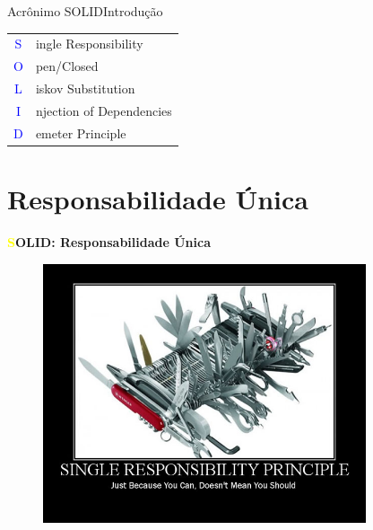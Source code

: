 \documentclass[10pt]{beamer}
\begin{document}

\begin{frame}{Acrônimo SOLID}{Introdução}

\begin{table}[H]
  \centering
  \setlength{\tabcolsep}{1pt}
  \begin{tabular}{cl}
    \Huge \textcolor{blue}{S} & \large ingle Responsibility \\
    \Huge \textcolor{blue}{O} & \large pen/Closed \\
    \Huge \textcolor{blue}{L} & \large iskov Substitution \\
    \Huge \textcolor{blue}{I} & \large njection of Dependencies \\
    \Huge \textcolor{blue}{D} & \large emeter Principle \\
  \end{tabular}
\end{table}

\end{frame}

\section{Responsabilidade Única}

\begin{frame}{\textbf{\textcolor{yellow}{S}OLID: Responsabilidade Única}}
	\begin{figure}[ht]
 		\centering
    	\includegraphics[width=0.85\textwidth, keepaspectratio=true]{images/srp.jpg}
	\end{figure}
\end{frame}
\end{document}
